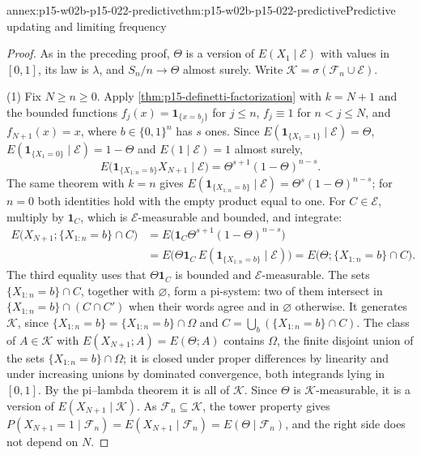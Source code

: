 \begin{annexitem}{annex:p15-w02b-p15-022-predictive}{thm:p15-w02b-p15-022-predictive}{Predictive updating and limiting frequency}
\begin{proof}
As in the preceding proof, \(\Theta\) is a version of
\(E(X_1\mid\mathcal E)\) with values in \([0,1]\), its law is \(\lambda\),
and \(S_n/n\to\Theta\) almost surely. Write
\(\mathcal K=\sigma(\mathcal F_n\cup\mathcal E)\).

(1) Fix \(N\geq n\geq0\). Apply \cref{thm:p15-definetti-factorization}
with \(k=N+1\) and the bounded functions
\(f_j(x)=\mathbf1_{\{x=b_j\}}\) for \(j\leq n\), \(f_j\equiv1\) for
\(n<j\leq N\), and \(f_{N+1}(x)=x\), where \(b\in\{0,1\}^n\) has \(s\)
ones. Since \(E(\mathbf1_{\{X_1=1\}}\mid\mathcal E)=\Theta\),
\(E(\mathbf1_{\{X_1=0\}}\mid\mathcal E)=1-\Theta\) and
\(E(1\mid\mathcal E)=1\) almost surely,
\[
 E\bigl(\mathbf1_{\{X_{1:n}=b\}}X_{N+1}\mid\mathcal E\bigr)
       =\Theta^{s+1}(1-\Theta)^{n-s}.
\]
The same theorem with \(k=n\) gives
\(E(\mathbf1_{\{X_{1:n}=b\}}\mid\mathcal E)=\Theta^s(1-\Theta)^{n-s}\);
for \(n=0\) both identities hold with the empty product equal to one.
For \(C\in\mathcal E\), multiply by \(\mathbf1_C\), which is
\(\mathcal E\)-measurable and bounded, and integrate:
\[
 \begin{aligned}
 E\bigl(X_{N+1};\{X_{1:n}=b\}\cap C\bigr)
   &=E\bigl(\mathbf1_C\Theta^{s+1}(1-\Theta)^{n-s}\bigr)\\
   &=E\bigl(\Theta\mathbf1_C\,E(\mathbf1_{\{X_{1:n}=b\}}\mid\mathcal E)\bigr)
   =E\bigl(\Theta;\{X_{1:n}=b\}\cap C\bigr).
 \end{aligned}
\]
The third equality uses that \(\Theta\mathbf1_C\) is bounded and
\(\mathcal E\)-measurable. The sets \(\{X_{1:n}=b\}\cap C\), together
with \(\varnothing\), form a pi-system: two of them intersect in
\(\{X_{1:n}=b\}\cap(C\cap C')\) when their words agree and in
\(\varnothing\) otherwise. It generates \(\mathcal K\), since
\(\{X_{1:n}=b\}=\{X_{1:n}=b\}\cap\Omega\) and
\(C=\bigcup_b(\{X_{1:n}=b\}\cap C)\). The class of
\(A\in\mathcal K\) with \(E(X_{N+1};A)=E(\Theta;A)\) contains
\(\Omega\), the finite disjoint union of the sets
\(\{X_{1:n}=b\}\cap\Omega\); it is closed under proper differences by
linearity and under increasing unions by dominated convergence, both
integrands lying in \([0,1]\). By the pi--lambda theorem it is all of
\(\mathcal K\). Since \(\Theta\) is \(\mathcal K\)-measurable, it is a
version of \(E(X_{N+1}\mid\mathcal K)\). As
\(\mathcal F_n\subseteq\mathcal K\), the tower property gives
\(P(X_{N+1}=1\mid\mathcal F_n)=E(X_{N+1}\mid\mathcal F_n)
=E(\Theta\mid\mathcal F_n)\), and the right side does not depend on \(N\).


\end{proof}
\end{annexitem}
